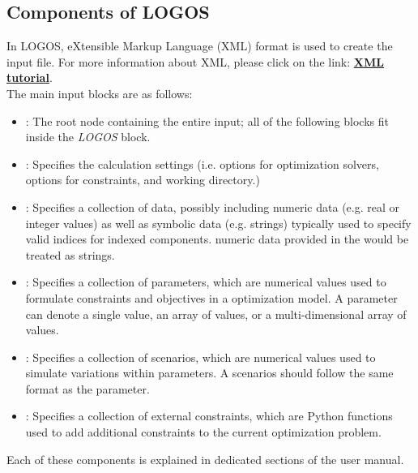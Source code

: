 \subsection{Components of LOGOS}
In LOGOS, eXtensible Markup Language (XML) format is used to create the input file. 
For more information about XML, please click on the link:
\href{https://www.w3schools.com/xml/default.asp}{\textbf{XML tutorial}}.
%
\\The main input blocks are as follows:
\begin{itemize}
  \item {}: The root node containing the
  entire input; all of
  the following blocks fit inside the \emph{LOGOS} block.
  \item {}: Specifies the calculation settings (i.e. options for
	optimization solvers, options for constraints, and working directory.)
  \item {}: Specifies a collection of data, possibly including
	numeric data (e.g. real or integer values) as well as symbolic data (e.g. strings)
	typically used to specify valid indices for indexed components.
	\nb numeric data provided in the  would be treated as strings.
	\item {}: Specifies a collection of parameters, which are
  numerical values used to formulate constraints and objectives in a
	optimization model. A parameter can denote a single value, an array of values, or a multi-dimensional
	array of values.
	\item {}: Specifies a collection of scenarios, which are
	numerical values used to simulate variations within parameters. A scenarios should follow
	the same format as the parameter.
	\item {}: Specifies a collection of external constraints, which are
  Python functions used to add additional constraints to the
	current optimization problem.
\end{itemize}

Each of these components is explained in dedicated sections of the user manual.

